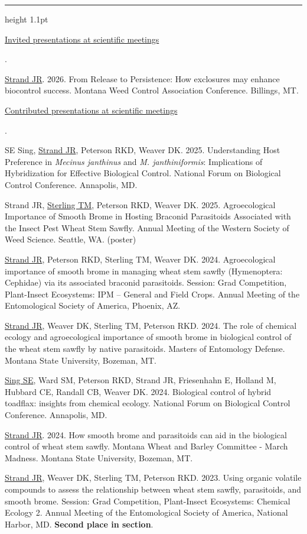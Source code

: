 \documentclass[10pt,letterpaper]{article}
\newcounter{cvnumi}
\newenvironment{cvnum}{\begin{list}{\arabic{cvnumi}.}{\usecounter{cvnumi}\setlength{\leftmargin}{2.2em}\setlength{\labelwidth}{1.6em}\setlength{\labelsep}{0.6em}\setlength{\itemsep}{2pt}\setlength{\topsep}{2pt}\setlength{\parsep}{0pt}}}{\end{list}}
\newcommand{\cvsection}[1]{\par\vspace{11pt}{\large\bfseries\MakeUppercase{#1}}\par\vspace{1pt}\hrule height 1.1pt\vspace{6pt}\nopagebreak[4]}
\newcommand{\cvsub}[1]{\par\vspace{3pt}\uline{#1}\par\nopagebreak[4]\vspace{3pt}}
\begin{document}
\cvsection{Presentations}
\cvsub{Invited presentations at scientific meetings}
\begin{cvnum}
\item \uline{Strand JR}. 2026. From Release to Persistence: How exclosures may enhance biocontrol success. Montana Weed Control Association Conference. Billings, MT.
\end{cvnum}
\cvsub{Contributed presentations at scientific meetings}
\begin{cvnum}
\item SE Sing, \uline{Strand JR}, Peterson RKD, Weaver DK. 2025. Understanding Host Preference in \emph{Mecinus janthinus} and \emph{M. janthiniformis}: Implications of Hybridization for Effective Biological Control. National Forum on Biological Control Conference. Annapolis, MD.
\item Strand JR, \uline{Sterling TM}, Peterson RKD, Weaver DK. 2025. Agroecological Importance of Smooth Brome in Hosting Braconid Parasitoids Associated with the Insect Pest Wheat Stem Sawfly. Annual Meeting of the Western Society of Weed Science. Seattle, WA. (poster)
\item \uline{Strand JR}, Peterson RKD, Sterling TM, Weaver DK. 2024. Agroecological importance of smooth brome in managing wheat stem sawfly (Hymenoptera: Cephidae) via its associated braconid parasitoids. Session: Grad Competition, Plant-Insect Ecosystems: IPM – General and Field Crops. Annual Meeting of the Entomological Society of America, Phoenix, AZ.
\item \uline{Strand JR}, Weaver DK, Sterling TM, Peterson RKD. 2024. The role of chemical ecology and agroecological importance of smooth brome in biological control of the wheat stem sawfly by native parasitoids. Masters of Entomology Defense. Montana State University, Bozeman, MT.
\item \uline{Sing SE}, Ward SM, Peterson RKD, Strand JR, Friesenhahn E, Holland M, Hubbard CE, Randall CB, Weaver DK. 2024. Biological control of hybrid toadflax: insights from chemical ecology. National Forum on Biological Control Conference. Annapolis, MD.
\item \uline{Strand JR}. 2024. How smooth brome and parasitoids can aid in the biological control of wheat stem sawfly. Montana Wheat and Barley Committee - March Madness. Montana State University, Bozeman, MT.
\item \uline{Strand JR}, Weaver DK, Sterling TM, Peterson RKD. 2023. Using organic volatile compounds to assess the relationship between wheat stem sawfly, parasitoids, and smooth brome. Session: Grad Competition, Plant-Insect Ecosystems: Chemical Ecology 2. Annual Meeting of the Entomological Society of America, National Harbor, MD. \textbf{Second place in section}.

\end{cvnum}
\end{document}

